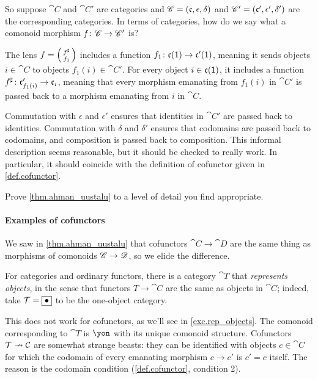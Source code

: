 \documentclass[DynamicalBook]{subfiles}
\begin{document}
So suppose $\cat{C}$ and $\cat{C}'$ are categories and $\mathscr{C}=(\mathfrak{c},\epsilon,\delta)$ and $\mathscr{C}'=(\mathfrak{c}',\epsilon',\delta')$ are the corresponding categories. In terms of categories, how do we say what a comonoid morphism $f\colon \mathscr{C}\to\mathscr{C}'$ is?

The lens $f=\lens{f^\sharp}{f_1}$ includes a function $f_1\colon\mathfrak{c}(\textsf{1})\to\mathfrak{c}'(\textsf{1})$, meaning it sends objects $i\in \cat{C}$ to objects $f_1(i)\in\cat{C}'$. For every object $i\in\mathfrak{c}(\textsf{1})$, it includes a function $f^\sharp\colon\mathfrak{c}'_{f_1(i)}\to\mathfrak{c}_i$, meaning that every morphism emanating from $f_1(i)$ in $\cat{C}'$ is passed back to a morphism emanating from $i$ in $\cat{C}$.

Commutation with $\epsilon$ and $\epsilon'$ ensures that identities in $\cat{C}'$ are passed back to identities. Commutation with $\delta$ and $\delta'$ ensures that codomains are passed back to codomains, and composition is passed back to composition. This informal description seems reasonable, but it should be checked to really work. In particular, it should coincide with the definition of cofunctor given in \cref{def.cofunctor}.

\begin{exercise}\label{ex.cofunctors_comon_homs}
Prove \cref{thm.ahman_uustalu} to a level of detail you find appropriate.
\end{exercise}

\paragraph{Examples of cofunctors}

We saw in \cref{thm.ahman_uustalu} that cofunctors $\cat{C}\to\cat{D}$ are the same thing as morphisms of comonoids $\mathscr{C}\to\mathscr{D}$, so we elide the difference.

\begin{example}\label{ex.rep_objects}
For categories and ordinary functors, there is a category $\cat{T}$ that \emph{represents objects}, in the sense that functors $T\to\cat{C}$ are the same as objects in $\cat{C}$; indeed, take $\mathcal{T}=\fbox{$\bullet$}$ to be the one-object category.

This does not work for cofunctors, as we'll see in \cref{exc.rep_objects}. The comonoid corresponding to $\cat{T}$ is $\yon$ with its unique comonoid structure. Cofunctors $\mathcal{T}\nrightarrow\mathcal{C}$ are somewhat strange beasts: they can be identified with objects $c\in\cat{C}$ for which the codomain of every emanating morphism $c\to c'$ is $c'=c$ itself. The reason is the codomain condition (\cref{def.cofunctor}, condition 2).
\end{example}
\end{document}
